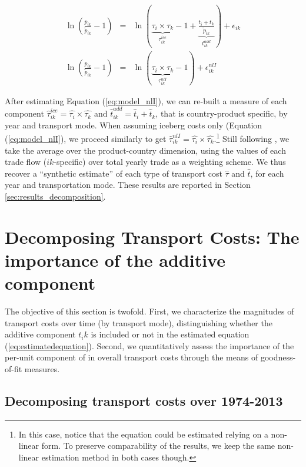 \documentclass[a4paper,11pt]{article}
\begin{document}
\begin{eqnarray}
\ln\left(\frac{p_{ik}}{\widetilde{p}_{ik}}-1 \right)&=& \ln \left(\underbrace{\tau_{i} \times \tau_{k}}_{\tau^{ice}_{ik}}-1 +\underbrace{\frac{t_{i} + t_{k}}{\widetilde{p}_{ik}}}_{t^{add}_{ik}} \right) + \epsilon_{ik} \label{eq:model_with_add} \\
\ln\left(\frac{p_{ik}}{\widetilde{p}_{ik}}-1 \right)&=& \ln \left(\underbrace{\tau_{i} \times \tau_{k}}_{\tau^{nlI}_{ik}}-1 \right) + \epsilon^{nlI}_{ik} \label{eq:model_nlI}
\end{eqnarray}

After estimating Equation (\ref{eq:model_nlI}), we can re-built a measure of each component $\widehat{\tau}^{ice}_{ik} = \widehat{\tau_{i}} \times \widehat{\tau_{k}}$ and $\widehat{t}^{add}_{ik} = \widehat{t}_{i} + \widehat{t}_{k}$, that is country-product specific, by year and transport mode. When assuming iceberg costs only (Equation (\ref{eq:model_nlI}), we proceed similarly to get $\widehat{\tau}^{nlI}_{ik} = \widehat{\tau_{i}} \times \widehat{\tau_{k}}$.\footnote{In this case, notice that the equation could be estimated relying on a non-linear form. To preserve comparability of the results, we keep the same non-linear estimation method in both cases though.} Still following \citet{Irrazabal_2015}, we take the average over the product-country dimension, using the values of each trade flow ($ik$-specific) over total yearly trade as a weighting scheme. We thus recover a ``synthetic estimate'' of each type of transport cost $\widehat{\tau}$ and $\widehat{t}$, for each year and transportation mode. These results are reported in Section \ref{sec:results_decomposition}.


\section{Decomposing Transport Costs: The importance of the additive component \label{sec:results_decomposition}}

The objective of this section is twofold. First, we characterize the magnitudes of transport costs over time (by transport mode), distinguishing whether the additive component $t_ik$ is included or not in the estimated equation (\ref{eq:estimatedequation}). Second, we quantitatively assess the importance of the per-unit component of in overall transport costs through the means of goodness-of-fit measures.


\subsection{Decomposing transport costs over 1974-2013}
\end{document}
